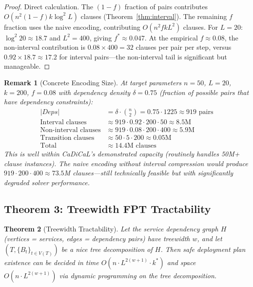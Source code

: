 \documentclass[10pt,twocolumn]{article}
\newtheorem{theorem}{Theorem}[section]
\newtheorem{remark}[theorem]{Remark}
\begin{document}
\begin{proof}
Direct calculation. The $(1-f)$ fraction of pairs contributes $O(n^2 (1-f) k \log^2 L)$ clauses (Theorem~\ref{thm:interval}). The remaining $f$ fraction uses the naive encoding, contributing $O(n^2 f k L^2)$ clauses. For $L = 20$: $\log^2 20 \approx 18.7$ and $L^2 = 400$, giving $f^* \approx 0.047$. At the empirical $f \approx 0.08$, the non-interval contribution is $0.08 \times 400 = 32$ clauses per pair per step, versus $0.92 \times 18.7 \approx 17.2$ for interval pairs---the non-interval tail is significant but manageable.
\end{proof}

\begin{remark}[Concrete Encoding Size]
At target parameters $n=50$, $L=20$, $k=200$, $f=0.08$ with dependency density $\delta = 0.75$ (fraction of possible pairs that have dependency constraints):
\begin{align*}
  |\mathit{Deps}| &= \delta \cdot \binom{n}{2} = 0.75 \cdot 1225 \approx 919 \text{ pairs} \\
  \text{Interval clauses} &\approx 919 \cdot 0.92 \cdot 200 \cdot 50 \approx 8.5\text{M} \\
  \text{Non-interval clauses} &\approx 919 \cdot 0.08 \cdot 200 \cdot 400 \approx 5.9\text{M} \\
  \text{Transition clauses} &\approx 50 \cdot 5 \cdot 200 \approx 0.05\text{M} \\
  \text{Total} &\approx 14.4\text{M clauses}
\end{align*}
This is well within CaDiCaL's demonstrated capacity (routinely handles 50M+ clause instances). The naive encoding without interval compression would produce $919 \cdot 200 \cdot 400 \approx 73.5$M clauses---still technically feasible but with significantly degraded solver performance.
\end{remark}

\subsection{Theorem 3: Treewidth FPT Tractability}
\label{sec:treewidth}

\begin{theorem}[Treewidth Tractability]
\label{thm:treewidth}
Let the service dependency graph $H$ (vertices = services, edges = dependency pairs) have treewidth $w$, and let $(T, \{B_t\}_{t \in V(T)})$ be a nice tree decomposition of $H$. Then safe deployment plan existence can be decided in time $O(n \cdot L^{2(w+1)} \cdot k^*)$ and space $O(n \cdot L^{2(w+1)})$ via dynamic programming on the tree decomposition.
\end{theorem}
\end{document}
